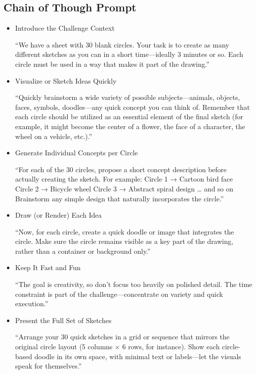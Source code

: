 \subsection{Chain of Though Prompt}

\begin{itemize}
    \item Introduce the Challenge Context

“We have a sheet with 30 blank circles. Your task is to create as many different sketches as you can in a short time—ideally 3 minutes or so. Each circle must be used in a way that makes it part of the drawing.”

\item Visualize or Sketch Ideas Quickly

“Quickly brainstorm a wide variety of possible subjects—animals, objects, faces, symbols, doodles—any quick concept you can think of. Remember that each circle should be utilized as an essential element of the final sketch (for example, it might become the center of a flower, the face of a character, the wheel on a vehicle, etc.).”

\item Generate Individual Concepts per Circle

“For each of the 30 circles, propose a short concept description before actually creating the sketch. For example:
Circle 1 → Cartoon bird face
Circle 2 → Bicycle wheel
Circle 3 → Abstract spiral design
… and so on
Brainstorm any simple design that naturally incorporates the circle.”

\item Draw (or Render) Each Idea

“Now, for each circle, create a quick doodle or image that integrates the circle. Make sure the circle remains visible as a key part of the drawing, rather than a container or background only.”

\item Keep It Fast and Fun

“The goal is creativity, so don’t focus too heavily on polished detail. The time constraint is part of the challenge—concentrate on variety and quick execution.”


\item Present the Full Set of Sketches

“Arrange your 30 quick sketches in a grid or sequence that mirrors the original circle layout (5 columns × 6 rows, for instance). Show each circle-based doodle in its own space, with minimal text or labels—let the visuals speak for themselves.”


\end{itemize}
